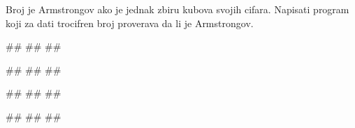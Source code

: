\begin{Exercise}[label=p1.2_02] 
Broj je Armstrongov ako je jednak zbiru kubova svojih cifara. Napisati program koji za dati trocifren broj proverava da li je Armstrongov.

\begin{miditest}
\begin{upotreba}{1}
#\naslovInt#
##
##
\end{upotreba}
\end{miditest}
\begin{miditest}
\begin{upotreba}{2}
#\naslovInt#
##
##
\end{upotreba}
\end{miditest}

\begin{miditest}
\begin{upotreba}{3}
#\naslovInt#
##
##
\end{upotreba}
\end{miditest}
\begin{miditest}
\begin{upotreba}{4}
#\naslovInt#
##
##
\end{upotreba}
\end{miditest}

\end{Exercise}
\ifresenja
 \begin{Answer}[ref=p1.2_02]
\end{Answer}
\fi

